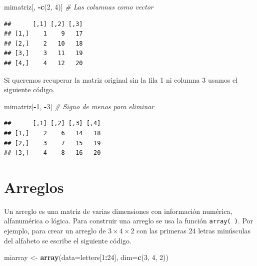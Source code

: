 \documentclass[10pt,]{krantz}
\makeatletter
\newenvironment{Shaded}{\begin{snugshade}}{\end{snugshade}}
\newcommand{\KeywordTok}[1]{\textcolor[rgb]{0.13,0.29,0.53}{\textbf{#1}}}
\newcommand{\DataTypeTok}[1]{\textcolor[rgb]{0.13,0.29,0.53}{#1}}
\newcommand{\DecValTok}[1]{\textcolor[rgb]{0.00,0.00,0.81}{#1}}
\newcommand{\StringTok}[1]{\textcolor[rgb]{0.31,0.60,0.02}{#1}}
\newcommand{\CommentTok}[1]{\textcolor[rgb]{0.56,0.35,0.01}{\textit{#1}}}
\newcommand{\OperatorTok}[1]{\textcolor[rgb]{0.81,0.36,0.00}{\textbf{#1}}}
\newcommand{\NormalTok}[1]{#1}
\newenvironment{kframe}{%
\medskip{}
\setlength{\fboxsep}{.8em}
 \def\at@end@of@kframe{}%
 \ifinner\ifhmode%
  \def\at@end@of@kframe{\end{minipage}}%
  \begin{minipage}{\columnwidth}%
 \fi\fi%
 \def\FrameCommand##1{\hskip\@totalleftmargin \hskip-\fboxsep
 \colorbox{shadecolor}{##1}\hskip-\fboxsep
     \hskip-\linewidth \hskip-\@totalleftmargin \hskip\columnwidth}%
 \MakeFramed {\advance\hsize-\width
   \@totalleftmargin\z@ \linewidth\hsize
   \@setminipage}}%
 {\par\unskip\endMakeFramed%
 \at@end@of@kframe}
\renewenvironment{Shaded}{\begin{kframe}}{\end{kframe}}
\makeatother
\begin{document}
\begin{Shaded}
\begin{Highlighting}[]
\NormalTok{mimatriz[, }\OperatorTok{-}\KeywordTok{c}\NormalTok{(}\DecValTok{2}\NormalTok{, }\DecValTok{4}\NormalTok{)]  }\CommentTok{# Las columnas como vector}
\end{Highlighting}
\end{Shaded}

\begin{verbatim}
##      [,1] [,2] [,3]
## [1,]    1    9   17
## [2,]    2   10   18
## [3,]    3   11   19
## [4,]    4   12   20
\end{verbatim}

Si queremos recuperar la matriz original sin la fila 1 ni columna 3
usamos el siguiente código.

\begin{Shaded}
\begin{Highlighting}[]
\NormalTok{mimatriz[}\OperatorTok{-}\DecValTok{1}\NormalTok{, }\OperatorTok{-}\DecValTok{3}\NormalTok{]  }\CommentTok{# Signo de menos para eliminar}
\end{Highlighting}
\end{Shaded}

\begin{verbatim}
##      [,1] [,2] [,3] [,4]
## [1,]    2    6   14   18
## [2,]    3    7   15   19
## [3,]    4    8   16   20
\end{verbatim}

\section{\texorpdfstring{Arreglos 
}{Arreglos  }}\label{arreglos}

Un arreglo es una matriz de varias dimensiones con información numérica,
alfanumérica o lógica. Para construir una arreglo se usa la función
\texttt{array(\ )}. Por ejemplo, para crear un arreglo de
\(3 \times 4 \times 2\) con las primeras 24 letras minúsculas del
alfabeto se escribe el siguiente código.

\begin{Shaded}
\begin{Highlighting}[]
\NormalTok{miarray <-}\StringTok{ }\KeywordTok{array}\NormalTok{(}\DataTypeTok{data=}\NormalTok{letters[}\DecValTok{1}\OperatorTok{:}\DecValTok{24}\NormalTok{], }\DataTypeTok{dim=}\KeywordTok{c}\NormalTok{(}\DecValTok{3}\NormalTok{, }\DecValTok{4}\NormalTok{, }\DecValTok{2}\NormalTok{))}
\end{Highlighting}
\end{Shaded}
\end{document}
